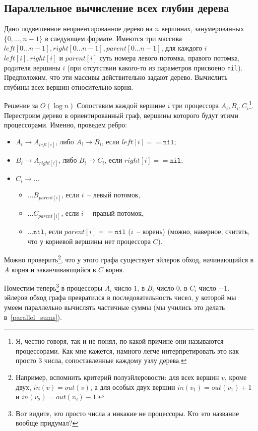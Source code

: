 \subsection{Параллельное вычисление всех глубин дерева}
\begin{problem*}
	Дано подвешенное неориентированное дерево на $n$ вершинах, занумерованных \\ $\{0,\ldots,n-1\}$ в следующем формате. Имеются три массива $left[0\ldots n-1], right[0\ldots n-1], parent[0\ldots n-1]$, для каждого $i$ $left[i], right[i] \text{ и } parent[i]$ суть номера левого потомка, правого потомка, родителя вершины $i$ (при отсутствии какого-то из параметров присвоено \texttt{nil}). Предположим, что эти массивы действительно задают дерево. Вычислить глубины всех вершин относительно корня.
\end{problem*}
\begin{algodescription}{Решение за $O(\log n)$} Сопоставим каждой вершине $i$ три процессора $A_i, B_i, C_i$\footnote{Я, честно говоря, так и не понял, по какой причине они называются процессорами. Как мне кажется, намного легче интерпретировать это как просто 3 числа, сопоставленные каждому узлу дерева.}. Перестроим дерево в ориентированный граф, вершины которого будут этими процессорами. Именно, проведем ребро:
\begin{itemize}
	\item $A_i \rightarrow A_{left[i]}$, либо $A_i \rightarrow B_i$, если $left[i] == \texttt{nil}$;
	\item $B_i \rightarrow A_{right[i]}$, либо $B_i \rightarrow C_i$, если $right[i] == \texttt{nil}$;
	\item $C_i \rightarrow \ldots$
	\begin{itemize}
		\item $\ldots B_{parent[i]}$, если $i$~-- левый потомок,
		\item $\ldots C_{parent[i]}$, если $i$~-- правый потомок,
		\item $\ldots \texttt{nil}$, если $parent[i] == \texttt{nil}$ ($i$~-- корень) (можно, наверное, считать, что у корневой вершины нет процессора $C$).
	\end{itemize}
\end{itemize}

Можно проверить\footnote{Например, вспомнить критерий полуэйлеровости: для всех вершин $v$, кроме двух, $in(v) = out(v)$, а для особых двух вершин $in(v_1) = out(v_1) + 1$ и $in(v_2) = out(v_2) - 1$.}, что у этого графа существует эйлеров обход, начинающийся в $A$ корня и заканчивающийся в $C$ корня.

Поместим теперь\footnote{Вот видите, это просто числа а никакие не процессоры. Кто это название вообще придумал?} в процессоры $A_i$ число $1$, в $B_i$ число $0$, в $C_i$ число $-1$. эйлеров обход графа превратился в последовательность чисел, у которой мы умеем параллельно вычислять частичные суммы (мы учились это делать в~\ref{parallel_sums}).
\end{algodescription}

